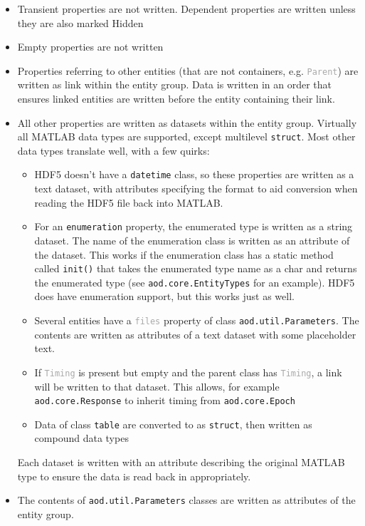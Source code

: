 \documentclass[10pt]{exam}
\newcommand\aodclass[1]{\textcolor{codeblue}{\texttt{#1}}}
\newcommand\matclass[1]{\textcolor{codeblue}{\texttt{#1}}}
\newcommand\aodprop[1]{\textcolor{darkgray}{\texttt{#1}}}
\newcommand\aodfcn[1]{\textcolor{darkteal}{\texttt{#1}}}
\begin{document}
		\begin{itemize}
			\item Transient properties are not written. Dependent properties are written unless they are also marked Hidden
			\item Empty properties are not written
			\item Properties referring to other entities (that are not containers, e.g. \aodprop{Parent}) are written as link within the entity group. Data is written in an order that ensures linked entities are written before the entity containing their link.
			\item All other properties are written as datasets within the entity group. Virtually all MATLAB data types are supported, except multilevel \matclass{struct}. Most other data types translate well, with a few quirks:
			\begin{itemize}
				\item HDF5 doesn't have a \matclass{datetime} class, so these properties are written as a text dataset, with attributes specifying the format to aid conversion when reading the HDF5 file back into MATLAB.
				\item For an \aodclass{enumeration} property, the enumerated type is written as a string dataset. The name of the enumeration class is written as an attribute of the dataset. This works if the enumeration class has a static method called \aodfcn{init()} that takes the enumerated type name as a char and returns the enumerated type (see \aodclass{aod.core.EntityTypes} for an example). HDF5 does have enumeration support, but this works just as well. 
				\item Several entities have a \aodprop{files} property of class \aodclass{aod.util.Parameters}. The contents are written as attributes of a text dataset with some placeholder text.
				\item If \aodprop{Timing} is present but empty and the parent class has \aodprop{Timing}, a link will be written to that dataset. This allows, for example \aodclass{aod.core.Response} to inherit timing from \aodclass{aod.core.Epoch}
				\item Data of class \matclass{table} are converted to as \aodclass{struct}, then written as compound data types
			\end{itemize}
			Each dataset is written with an attribute describing the original MATLAB type to ensure the data is read back in appropriately.
			\item The contents of \aodclass{aod.util.Parameters} classes are written as attributes of the entity group.

\end{itemize}
\end{document}
